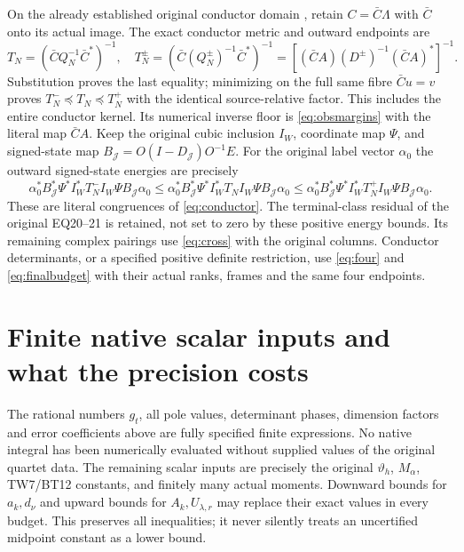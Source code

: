\documentclass[11pt]{article}
\begin{document}
On the already established original conductor domain \cite{TR},
retain $C=\bar C\Lambda$ with $\bar C$ onto its actual image.
The exact conductor metric and outward endpoints are
\begin{equation}\label{eq:conductor}
 T_N=(\bar C Q_N^{-1}\bar C^*)^{-1},\quad
 T_N^\pm=(\bar C(Q_N^\pm)^{-1}\bar C^*)^{-1}
       =[(\bar CA)(D^\pm)^{-1}(\bar CA)^*]^{-1}.
\end{equation}
Substitution proves the last equality; minimizing on the full same
fibre $\bar Cu=v$ proves $T_N^-\preceq T_N\preceq T_N^+$
with the identical source-relative factor. This includes the entire
conductor kernel. Its numerical inverse floor is
\eqref{eq:obsmargins} with the literal map $\bar CA$.
Keep the original cubic inclusion $I_W$, coordinate map $\Psi$,
and signed-state map $B_{\mathcal J}=O(I-D_{\mathcal J})O^{-1}E$.
For the original label vector $\alpha_0$ the outward signed-state
energies are precisely
\[
 \alpha_0^*B_{\mathcal J}^*\Psi^*I_W^*T_N^-I_W\Psi
               B_{\mathcal J}\alpha_0
 \le\alpha_0^*B_{\mathcal J}^*\Psi^*I_W^*T_NI_W\Psi
               B_{\mathcal J}\alpha_0
 \le\alpha_0^*B_{\mathcal J}^*\Psi^*I_W^*T_N^+I_W\Psi
               B_{\mathcal J}\alpha_0.
\]
These are literal congruences of \eqref{eq:conductor}. The
terminal-class residual of the original EQ20--21 is retained,
not set to zero by these positive energy bounds. Its remaining
complex pairings use \eqref{eq:cross} with the original columns.
Conductor determinants, or a specified positive definite
restriction, use \eqref{eq:four} and \eqref{eq:finalbudget} with
their actual ranks, frames and the same four endpoints.

\section{Finite native scalar inputs and what the precision costs}

The rational numbers $g_t$, all pole values, determinant phases,
dimension factors and error coefficients above are fully specified
finite expressions. No native integral has been numerically
evaluated without supplied values of the original quartet data.
The remaining scalar inputs are precisely the original
$\vartheta_h$, $M_\alpha$, TW7/BT12 constants, and finitely many
actual moments. Downward bounds for $a_k,d_\nu$ and upward bounds
for $A_k,U_{\lambda,r}$ may replace their exact values in every
budget. This preserves all inequalities; it never silently treats
an uncertified midpoint constant as a lower bound.
\end{document}
